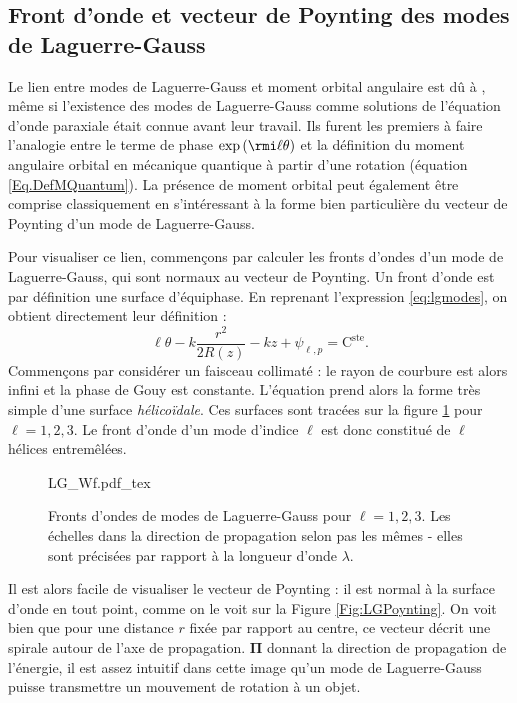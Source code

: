 \subsection{Front d'onde et vecteur de Poynting des modes de Laguerre-Gauss}
Le lien entre modes de Laguerre-Gauss et moment orbital angulaire est dû à , même si l'existence des modes de Laguerre-Gauss comme solutions de l'équation d'onde paraxiale était connue avant leur travail. Ils furent les premiers à faire l'analogie entre le terme de phase $\exp{({\rmi}\ell \theta )}$ et la définition du moment angulaire orbital en mécanique quantique à partir d'une rotation (équation \ref{Eq.DefMQuantum}). La présence de moment orbital peut également être comprise classiquement en s'intéressant à la forme bien particulière du vecteur de Poynting d'un mode de Laguerre-Gauss.\par
Pour visualiser ce lien, commençons par calculer les fronts d'ondes d'un mode de Laguerre-Gauss, qui sont normaux au vecteur de Poynting.
Un front d'onde est par définition une surface d'équiphase. En reprenant l'expression \ref{eq:lgmodes}, on obtient directement leur définition :
\begin{equation*}
\ell\theta-k\frac{r^2}{2R(z)}-kz+\psi _{\ell ,p} = \mathrm{C}^\mathrm{ste}.
\end{equation*}
Commençons par considérer un faisceau collimaté : le rayon de courbure est alors infini et la phase de Gouy est constante. L'équation prend alors la forme très simple d'une surface \textit{hélicoïdale}. Ces surfaces sont tracées sur la figure \ref{Fig:LGwf} pour $\ell = 1,2,3$. Le front d'onde d'un mode d'indice $\ell$ est donc constitué de $\ell$ hélices entremêlées.
\begin{figure}[!ht]
\centering
\def\svgwidth{\columnwidth}
{LG_Wf.pdf_tex}
\caption{Fronts d'ondes de modes de Laguerre-Gauss pour $\ell=1,2,3$. Les échelles dans la direction de propagation selon pas les mêmes - elles sont précisées par rapport à la longueur d'onde $\lambda$.}
\label{Fig:LGwf}
\end{figure}

Il est alors facile de visualiser le vecteur de Poynting : il est normal à la surface d'onde en tout point, comme on le voit sur la Figure \ref{Fig:LGPoynting}. On voit bien que pour une distance $r$ fixée par rapport au centre, ce vecteur décrit une spirale autour de l'axe de propagation. $\bm{\Pi}$ donnant la direction de propagation de l'énergie, il est assez intuitif dans cette image qu'un mode de Laguerre-Gauss puisse transmettre un mouvement de rotation à un objet.

